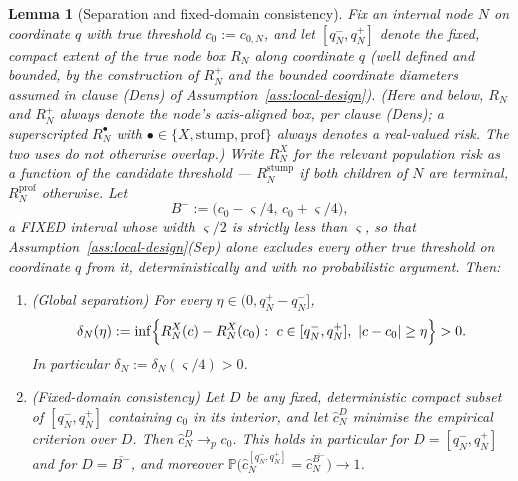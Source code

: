 \documentclass[11pt]{article}
\theoremstyle{plain}
\newtheorem{lemma}[theorem]{Lemma}
\theoremstyle{definition}
\theoremstyle{remark}
\newcommand{\PP}{\mathbb{P}}
\DeclarePairedDelimiter{\abs}{\lvert}{\rvert}
\begin{document}
\begin{lemma}[Separation and fixed-domain consistency]
\label{lem:fixed-domain}
Fix an internal node $N$ on coordinate $q$ with true threshold
$c_0:=c_{0,N}$, and let $[q_N^-,q_N^+]$ denote the fixed, compact extent of
the true node box $R_N$ along coordinate $q$ (well defined and bounded, by
the construction of $R_N^+$ and the bounded coordinate diameters assumed in
clause (Dens) of Assumption~\ref{ass:local-design}). (Here and below, $R_N$ and
$R_N^+$ always denote the node's
axis-aligned \emph{box}, per clause (Dens); a superscripted $R_N^{\bullet}$
with $\bullet\in\{X,\mathrm{stump},\mathrm{prof}\}$ always denotes a
real-valued \emph{risk}. The two uses do not otherwise overlap.) Write
$R_N^X$ for the relevant population risk as a
function of the candidate threshold --- $R_N^{\mathrm{stump}}$ if both
children of $N$ are terminal, $R_N^{\mathrm{prof}}$ otherwise. Let
\[
  B^-:=\bigl(c_0-\varsigma/4,\,c_0+\varsigma/4\bigr),
\]
a FIXED interval whose width $\varsigma/2$ is strictly less than $\varsigma$,
so that Assumption~\ref{ass:local-design}(Sep) alone excludes every
\emph{other} true threshold on coordinate $q$ from it, deterministically and
with no probabilistic argument. Then:
\begin{enumerate}[label=(\alph*)]
  \item (Global separation) For every $\eta\in(0,q_N^+-q_N^-]$,
  \[
    \delta_N(\eta)
    :=
    \inf\Bigl\{R_N^X(c)-R_N^X(c_0):\
      c\in[q_N^-,q_N^+],\ \abs{c-c_0}\ge\eta\Bigr\}
    >0.
  \]
  In particular $\delta_N:=\delta_N(\varsigma/4)>0$.
  \item (Fixed-domain consistency) Let $D$ be any fixed, deterministic
  compact subset of $[q_N^-,q_N^+]$ containing $c_0$ in its interior, and let
  $\widehat c_N^D$ minimise the empirical criterion over $D$. Then
  $\widehat c_N^D\to_pc_0$. This holds in particular for
  $D=[q_N^-,q_N^+]$ and for $D=\overline{B^-}$, and moreover
  $\PP\bigl(\widehat c_N^{[q_N^-,q_N^+]}=\widehat c_N^{\overline{B^-}}\bigr)
  \to1$.
\end{enumerate}
\end{lemma}
\end{document}
